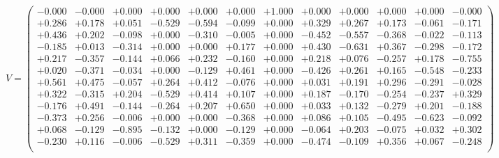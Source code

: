 \documentclass[9pt]{article}
\theoremstyle{plain}
\theoremstyle{definition}
\theoremstyle{remark}
\numberwithin{equation}{section}
\begin{document}
$V = \left(
\begin{array}{
cccccccccccc}
-0.000 & -0.000 & +0.000 & +0.000 & +0.000 & +0.000 & +1.000 & +0.000 & +0.000 & +0.000 & +0.000 & -0.000 \\
+0.286 & +0.178 & +0.051 & -0.529 & -0.594 & -0.099 & +0.000 & +0.329 & +0.267 & +0.173 & -0.061 & -0.171 \\
+0.436 & +0.202 & -0.098 & +0.000 & -0.310 & -0.005 & +0.000 & -0.452 & -0.557 & -0.368 & -0.022 & -0.113 \\
-0.185 & +0.013 & -0.314 & +0.000 & +0.000 & +0.177 & +0.000 & +0.430 & -0.631 & +0.367 & -0.298 & -0.172 \\
+0.217 & -0.357 & -0.144 & +0.066 & +0.232 & -0.160 & +0.000 & +0.218 & +0.076 & -0.257 & +0.178 & -0.755 \\
+0.020 & -0.371 & -0.034 & +0.000 & -0.129 & +0.461 & +0.000 & -0.426 & +0.261 & +0.165 & -0.548 & -0.233 \\
+0.561 & +0.475 & -0.057 & +0.264 & +0.412 & -0.076 & +0.000 & +0.031 & +0.191 & +0.296 & -0.291 & -0.028 \\
+0.322 & -0.315 & +0.204 & -0.529 & +0.414 & +0.107 & +0.000 & +0.187 & -0.170 & -0.254 & -0.237 & +0.329 \\
-0.176 & +0.491 & -0.144 & -0.264 & +0.207 & +0.650 & +0.000 & +0.033 & +0.132 & -0.279 & +0.201 & -0.188 \\
-0.373 & +0.256 & -0.006 & +0.000 & +0.000 & -0.368 & +0.000 & +0.086 & +0.105 & -0.495 & -0.623 & -0.092 \\
+0.068 & -0.129 & -0.895 & -0.132 & +0.000 & -0.129 & +0.000 & -0.064 & +0.203 & -0.075 & +0.032 & +0.302 \\
-0.230 & +0.116 & -0.006 & -0.529 & +0.311 & -0.359 & +0.000 & -0.474 & -0.109 & +0.356 & +0.067 & -0.248 \\
\end{array}
\right)$ \newline 
\end{document}
